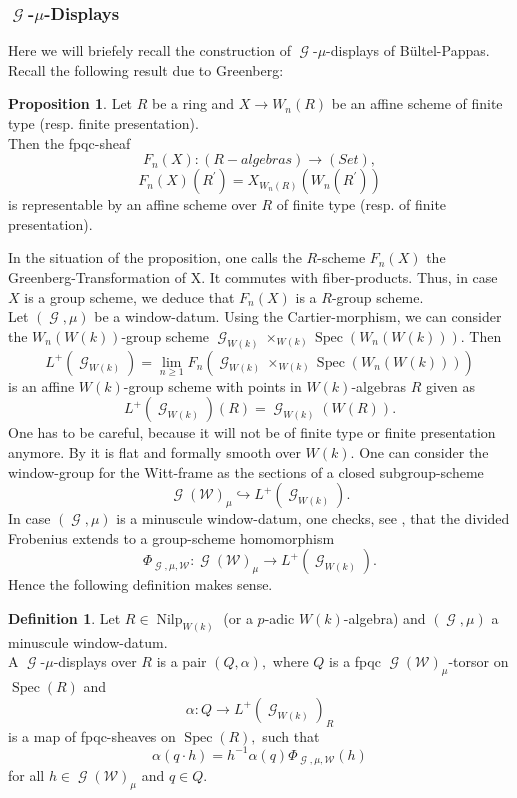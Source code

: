 \documentclass[a4paper,10,5 pt]{amsart}
\theoremstyle{definition}
\newtheorem{Definition}{Definition}
\newtheorem{proposition}[Satz]{Proposition}
\DeclareMathOperator{\Spec}{Spec}
\DeclareMathOperator{\Nilp}{Nilp}
\DeclareMathOperator{\G}{\mathcal{G}}
\begin{document}
\subsubsection{$\G$-$\mu$-Displays}
Here we will briefely recall the construction of $\G$-$\mu$-displays of Bültel-Pappas.
\\
Recall the following result due to Greenberg:
\begin{proposition}
Let $R$ be a ring and $X\rightarrow W_{n}(R)$ be an affine scheme of finite type (resp. finite presentation).
\\
Then the fpqc-sheaf
$$F_{n}(X)\colon (R-algebras)\rightarrow (Set),$$
$$F_{n}(X)(R^{\prime})=X_{W_{n}(R)}(W_{n}(R^{\prime}))$$
is representable by an affine scheme over $R$ of finite type (resp. of finite presentation).
\end{proposition}
In the situation of the proposition, one calls the $R$-scheme $F_{n}(X)$ the Greenberg-Transformation of X. It commutes with fiber-products. Thus, in case $X$ is a group scheme, we deduce that $F_{n}(X)$ is a $R$-group scheme.
\\
Let $(\G,\mu)$ be a window-datum. Using the Cartier-morphism, we can consider the $W_{n}(W(k))$-group scheme $\G_{W(k)}\times_{W(k)} \Spec(W_{n}(W(k))).$ Then
$$L^{+}(\G_{W(k)})=\lim_{n\geq 1} F_{n}(\G_{W(k)}\times_{W(k)} \Spec(W_{n}(W(k))))$$
is an affine $W(k)$-group scheme with points in $W(k)$-algebras $R$ given as
$$
L^{+}(\G_{W(k)})(R)=\G_{W(k)}(W(R)).
$$ One has to be careful, because it will not be of finite type or finite presentation anymore. By \cite[Prop. 2.2.1.,(d)]{BP} it is flat and formally smooth over $W(k).$ One can consider the window-group for the Witt-frame as the sections of a closed subgroup-scheme
$$\G(\mathcal{W})_{\mu}\hookrightarrow L^{+}(\G_{W(k)}).$$ In case $(\G,\mu)$ is a minuscule window-datum, one checks, see \cite[Prop. 3.1.2.]{BP}, that the divided Frobenius extends to a group-scheme homomorphism
$$
\Phi_{\G,\mu,\mathcal{W}}\colon \G(\mathcal{W})_{\mu} \rightarrow L^{+}(\G_{W(k)}).
$$
Hence the following definition makes sense.
\begin{Definition}
Let $R\in \Nilp_{W(k)}$ (or a $p$-adic $W(k)$-algebra) and $(\G,\mu)$ a minuscule window-datum. 
\\
A $\G$-$\mu$-displays over $R$ is a pair $(Q,\alpha),$ where $Q$ is a fpqc $\G(\mathcal{W})_{\mu}$-torsor on $\Spec(R)$ and 
$$\alpha\colon Q \rightarrow L^{+}(\G_{W(k)})_{R}$$
is a map of fpqc-sheaves on $\Spec(R),$ such that 
$$\alpha(q\cdot h)=h^{-1}\alpha(q)\Phi_{\G,\mu,\mathcal{W}}(h)$$
for all $h\in \G(\mathcal{W})_{\mu}$ and $q\in Q.$
\end{Definition}
\end{document}
